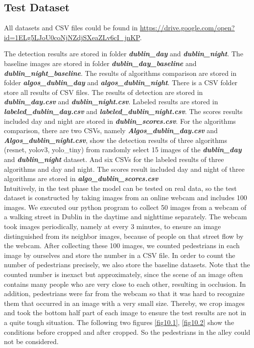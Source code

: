 \documentclass[runningheads]{llncs}
\begin{document}
\subsection{Test Dataset}
All datasets and CSV files could be found in \url{https://drive.google.com/open?id=1ELg5LJoU0coNjNZdjSXeaZLv6cI_jnKP}.

The detection results are stored in folder \textit{\textbf{dublin\_day}} 
and \textit{\textbf{dublin\_night}}. The baseline images are stored in folder \textit{\textbf{dublin\_day\_baseline}} and \textit{\textbf{dublin\_night\_baseline}}. The results of algorithms comparison are stored in folder \textit{\textbf{algos\_dublin\_day}} and \textit{\textbf{algos\_dublin\_night}}. There is a CSV folder store all results of CSV files. The results of detection are stored in \textit{\textbf{dublin\_day.csv}} and \textit{\textbf{dublin\_night.csv}}. Labeled results are stored in \textit{\textbf{labeled\_dublin\_day.csv}} and \textit{\textbf{labeled\_dublin\_night.csv}}. The scores results included day and night are stored in \textit{\textbf{dublin\_scores.csv}}. For the algorithms comparison, there are two CSVs, namely \textit{\textbf{Algos\_dublin\_day.csv}} and \textit{\textbf{Algos\_dublin\_night.csv}}, show the detection results of three algorithms (resnet, yolov3, yolo\_tiny) from randomly select 15 images of the \textit{\textbf{dublin\_day}} and \textit{\textbf{dublin\_night}} dataset. And six CSVs for the labeled results of three algorithms and day and night. The scores result included day and night of three algorithms are stored in \textit{\textbf{algo\_dublin\_scores.csv}}
\\

Intuitively, in the test phase the model can be tested on real data, so the test dataset is constructed by taking images from an online webcam and includes 100 images. We executed our python program to collect 50 images from a webcam of a walking street in Dublin in the daytime and nighttime separately. The webcam took images periodically, namely at every 3 minutes, to ensure an image distinguished from its neighbor images, because of people on that street flow by the webcam. After collecting these 100 images, we counted pedestrians in each image by ourselves and store the number in a CSV file. In order to count the number of pedestrians precisely, we also store the baseline datasets. Note that the counted number is inexact but approximately, since the scene of an image often contains many people who are very close to each other, resulting in occlusion. In addition, pedestrians were far from the webcam so that it was hard to recognize them that occurred in an image with a very small size. Thereby, we crop images and took the bottom half part of each image to ensure the test results are not in a quite tough situation. The following two figures \ref{fig10.1}, \ref{fig10.2} show the conditions before cropped and after cropped. So the pedestrians in the alley could not be considered. 
\end{document}
